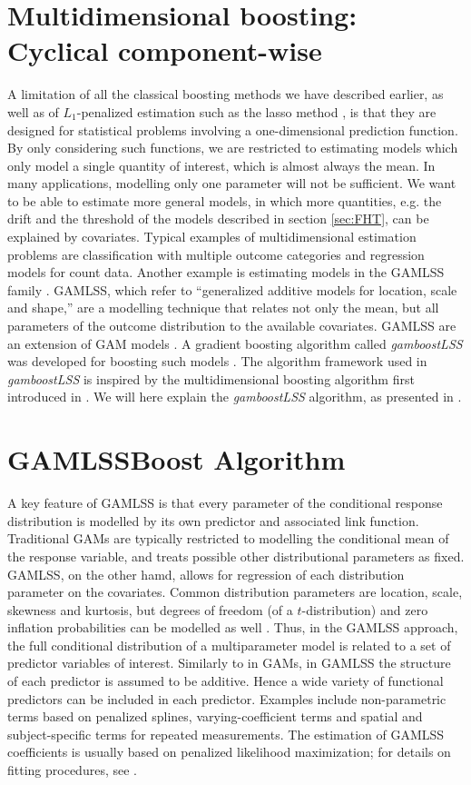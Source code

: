 \section{Multidimensional boosting: Cyclical component-wise}
A limitation of all the classical boosting methods we have described earlier, as well as of $L_1$-penalized estimation such as the lasso method \citep{lasso}, is that they are designed for statistical problems involving a one-dimensional prediction function. By only considering such functions, we are restricted to estimating models which only model a single quantity of interest, which is almost always the mean.
In many applications, modelling only one parameter will not be sufficient. We want to be able to estimate more general models, in which more quantities, e.g. the drift and the threshold of the models described in section \ref{sec:FHT}, can be explained by covariates. Typical examples of multidimensional estimation problems are classification with multiple outcome categories and regression models for count data. Another example is estimating models in the GAMLSS family \citep{gamlss}. GAMLSS, which refer to ``generalized additive models for location, scale and shape,'' are a modelling technique that relates not only the mean, but all parameters of the outcome distribution to the available covariates. GAMLSS are an extension of GAM models \citep{gam-book}. A gradient boosting algorithm called \textit{gamboostLSS} was developed for boosting such models \citep{gamboostlss-paper}. The algorithm framework used in \textit{gamboostLSS} is inspired by the multidimensional boosting algorithm first introduced in \citet{schmid}. We will here explain the \textit{gamboostLSS} algorithm, as presented in \citet{gamboostlss-paper}.

\section{GAMLSSBoost Algorithm}\label{sec:gamlssboost}
A key feature of GAMLSS is that every parameter of the conditional response distribution is modelled by its own predictor and associated link function.
Traditional GAMs \citep{gam-book} are typically restricted to modelling the conditional mean of the response variable,
and treats possible other distributional parameters as fixed. GAMLSS, on the other hamd, allows for regression of each distribution parameter
on the covariates. Common distribution parameters are location, scale, skewness and kurtosis, but degrees of freedom (of a $t$-distribution)
and zero inflation probabilities can be modelled as well \citep{gamboostlss-paper}. Thus, in the GAMLSS approach, the full conditional
distribution of a multiparameter model is related to a set of predictor variables of interest. Similarly to in GAMs, in GAMLSS the structure
of each predictor is assumed to be additive. Hence a wide variety of functional predictors can be included in each predictor.
Examples include non-parametric terms based on penalized splines, varying-coefficient terms and spatial and subject-specific terms for
repeated measurements. The estimation of GAMLSS coefficients is usually based on penalized likelihood maximization; for details
on fitting procedures, see \citet{gamlss}.

